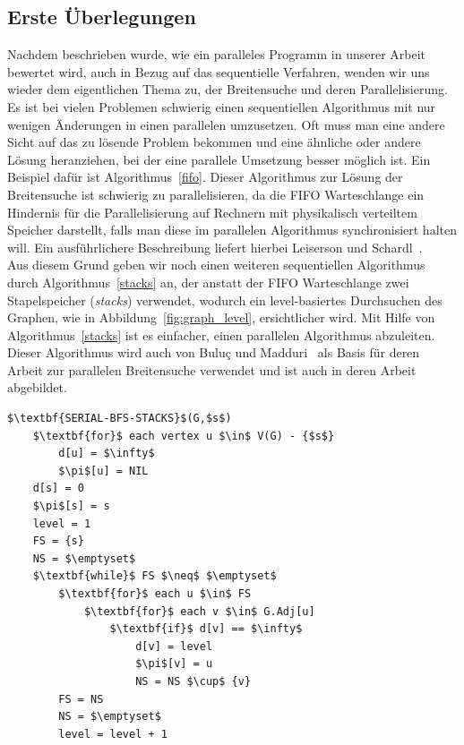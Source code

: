 \documentclass[11pt,a4paper]{article}
\begin{document}
\subsection{Erste Überlegungen}
Nachdem beschrieben wurde, wie ein paralleles Programm in unserer Arbeit bewertet wird, auch in Bezug auf das sequentielle Verfahren, wenden wir uns wieder dem eigentlichen Thema zu, der Breitensuche und deren Parallelisierung. Es ist bei vielen Problemen schwierig einen sequentiellen Algorithmus mit nur wenigen Änderungen in einen parallelen umzusetzen. Oft muss man eine andere Sicht auf das zu lösende Problem bekommen und eine ähnliche oder andere Lösung heranziehen, bei der eine parallele Umsetzung besser möglich ist. Ein Beispiel dafür ist Algorithmus~\ref{fifo}.  Dieser Algorithmus zur Lösung der Breitensuche ist schwierig zu parallelisieren, da die FIFO Warteschlange ein Hindernis für die Parallelisierung auf Rechnern mit physikalisch verteiltem Speicher darstellt, falls man diese im parallelen Algorithmus synchronisiert halten will. Ein ausführlichere Beschreibung liefert hierbei Leiserson und Schardl~\cite{leiserson}.\\
Aus diesem Grund geben wir noch einen weiteren sequentiellen Algorithmus durch Algorithmus~\ref{stacks} an, der anstatt der FIFO Warteschlange zwei Stapelspeicher (\textit{stacks}) verwendet, wodurch ein level-basiertes Durchsuchen des Graphen, wie in Abbildung~\ref{fig:graph_level}, ersichtlicher wird. Mit Hilfe von Algorithmus~\ref{stacks} ist es einfacher, einen parallelen Algorithmus abzuleiten. Dieser Algorithmus wird auch von Buluç und Madduri~\cite{buluc} als Basis für deren Arbeit zur parallelen Breitensuche verwendet und ist auch in deren Arbeit abgebildet.
\begin{lstlisting}[caption={Eine weitere sequentielle Variante der Breitensuche unter Verwendung von zwei Stacks \lstinline{FS} und \lstinline{NS} als Datenstrukturen. Dieser Algorithmus liefert das gleiche Ergebnis wie Algorithmus~\ref{fifo} und hat auch die gleiche Laufzeit wie dieser, ermöglicht jedoch eine bessere Sicht auf das level-basierte Durchsuchen des Graphen, was das Ableiten eines parallelen Algorithmus einfacher macht.},label=stacks]
$\textbf{SERIAL-BFS-STACKS}$(G,$s$)
	$\textbf{for}$ each vertex u $\in$ V(G) - {$s$}
		d[u] = $\infty$
		$\pi$[u] = NIL
	d[s] = 0
	$\pi$[s] = s
	level = 1
	FS = {s}
	NS = $\emptyset$
	$\textbf{while}$ FS $\neq$ $\emptyset$
		$\textbf{for}$ each u $\in$ FS
			$\textbf{for}$ each v $\in$ G.Adj[u]
				$\textbf{if}$ d[v] == $\infty$
					d[v] = level
					$\pi$[v] = u
					NS = NS $\cup$ {v}
		FS = NS
		NS = $\emptyset$
		level = level + 1
\end{lstlisting}
\end{document}
